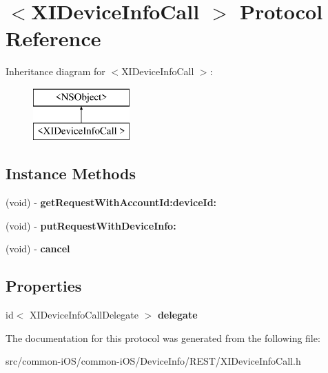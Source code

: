 \hypertarget{protocol_x_i_device_info_call_01-p}{}\section{$<$X\+I\+Device\+Info\+Call $>$ Protocol Reference}
\label{protocol_x_i_device_info_call_01-p}
Inheritance diagram for $<$X\+I\+Device\+Info\+Call $>$\+:\begin{figure}[H]
\begin{center}
\leavevmode
\includegraphics[height=2.000000cm]{protocol_x_i_device_info_call_01-p}
\end{center}
\end{figure}
\subsection*{Instance Methods}
\begin{DoxyCompactItemize}
\item 
\hypertarget{protocol_x_i_device_info_call_01-p_a4bd2c76b44d1d120cea9b132fb39b714}{}\label{protocol_x_i_device_info_call_01-p_a4bd2c76b44d1d120cea9b132fb39b714} 
(void) -\/ {\bfseries get\+Request\+With\+Account\+Id\+:device\+Id\+:}
\item 
\hypertarget{protocol_x_i_device_info_call_01-p_adc348ed302778c5d722354ec59d3662d}{}\label{protocol_x_i_device_info_call_01-p_adc348ed302778c5d722354ec59d3662d} 
(void) -\/ {\bfseries put\+Request\+With\+Device\+Info\+:}
\item 
\hypertarget{protocol_x_i_device_info_call_01-p_ad7718d72129ac1a1aed629d18cf8b463}{}\label{protocol_x_i_device_info_call_01-p_ad7718d72129ac1a1aed629d18cf8b463} 
(void) -\/ {\bfseries cancel}
\end{DoxyCompactItemize}
\subsection*{Properties}
\begin{DoxyCompactItemize}
\item 
\hypertarget{protocol_x_i_device_info_call_01-p_a5784b2251c4e65a9192af8d61c61b0a8}{}\label{protocol_x_i_device_info_call_01-p_a5784b2251c4e65a9192af8d61c61b0a8} 
id$<$ X\+I\+Device\+Info\+Call\+Delegate $>$ {\bfseries delegate}
\end{DoxyCompactItemize}


The documentation for this protocol was generated from the following file\+:\begin{DoxyCompactItemize}
\item 
src/common-\/i\+O\+S/common-\/i\+O\+S/\+Device\+Info/\+R\+E\+S\+T/X\+I\+Device\+Info\+Call.\+h\end{DoxyCompactItemize}
